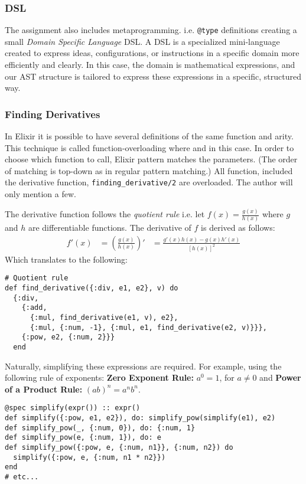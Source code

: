 \documentclass[a4paper,11pt]{article}
\begin{document}
\subsubsection*{DSL}
The assignment also includes metaprogramming.
i.e. \texttt{@type} definitions creating a small \emph{Domain Specific Language} DSL.
A DSL is a specialized mini-language created to express ideas, configurations, or instructions in a specific domain
more efficiently and clearly.
In this case, the domain is mathematical expressions,
and our AST structure is tailored to express these expressions in a specific, structured way.
%
%
\subsubsection*{Finding Derivatives}
In Elixir it is possible to have several definitions of the same function and arity.
This technique is called function-overloading where and in this case.
In order to choose which function to call,
Elixir pattern matches the parameters.
(The order of matching is top-down as in regular pattern matching.)
All function, included the derivative function,
\texttt{finding_derivative/2} are overloaded.
The author will only mention a few.

The derivative function follows the \emph{quotient rule} i.e.
let \( f(x) = \frac{g(x)}{h(x)} \) where \( g \) and \( h \) are differentiable functions.
The derivative of \( f \) is derived as follows:
    \begin{align*}
        f'(x) &= \left( \frac{g(x)}{h(x)} \right)'
        &= \frac{g'(x)h(x) - g(x)h'(x)}{[h(x)]^2}
    \end{align*}
Which translates to the following:
\begin{verbatim}
# Quotient rule
def find_derivative({:div, e1, e2}, v) do
  {:div,
    {:add,
      {:mul, find_derivative(e1, v), e2},
      {:mul, {:num, -1}, {:mul, e1, find_derivative(e2, v)}}},
    {:pow, e2, {:num, 2}}}
  end

\end{verbatim}
Naturally, simplifying these expressions are required.
For example, using the following rule of exponents:
\textbf{Zero Exponent Rule:} \( a^0 = 1 \), for \( a \neq 0 \) and
\textbf{Power of a Product Rule:} \( (ab)^n = a^n b^n \).
\begin{verbatim}
@spec simplify(expr()) :: expr()
def simplify({:pow, e1, e2}), do: simplify_pow(simplify(e1), e2)
def simplify_pow(_, {:num, 0}), do: {:num, 1}
def simplify_pow(e, {:num, 1}), do: e
def simplify_pow({:pow, e, {:num, n1}}, {:num, n2}) do
  simplify({:pow, e, {:num, n1 * n2}})
end
# etc...
\end{verbatim}
\end{document}
